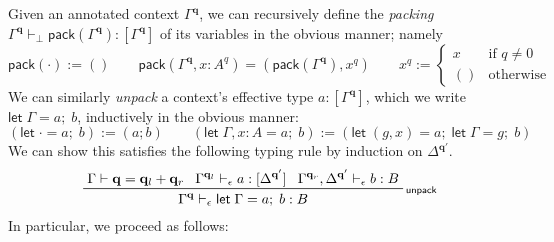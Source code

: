 \documentclass[acmsmall,screen,review]{acmart}
\newcommand{\mb}[1]{\ensuremath{\mathbf{#1}}}
\newcommand{\ms}[1]{\ensuremath{\mathsf{#1}}}
\newcommand{\letexpr}[3]{\ensuremath{\ms{let}\;#1 = #2;\;#3}}
\newcommand{\qsp}[4]{#1 \vdash #2 = #3 + #4}
\newcommand{\rle}[1]{{\scriptsize\textsf{#1}}}
\newcommand{\hasty}[4]{#1 \vdash_{#2} #3: {#4}}
\newcommand{\etoty}[1]{[#1]}
\begin{document}
Given an annotated context $\Gamma^{\mb{q}}$, we can recursively define the \emph{packing}
$\hasty{\Gamma^{\mb{q}}}{\bot}{\ms{pack}(\Gamma^{\mb{q}})}{\etoty{\Gamma^{\mb{q}}}}$ of its
variables in the obvious manner; namely
\begin{equation*}
  \ms{pack}(\cdot) := () \qquad
  \ms{pack}(\Gamma^{\mb{q}}, x : A^q) = (\ms{pack}(\Gamma^{\mb{q}}), x^q) \qquad
  x^q :=
  \begin{cases}
    x & \text{if } q \neq 0 \\
    () & \text{otherwise}
  \end{cases}
\end{equation*}
We can similarly \emph{unpack} a context's effective type $a : [\ms{\Gamma}^{\mb{q}}]$, which we
write $\letexpr{\Gamma}{a}{b}$, inductively in the obvious manner:
\begin{equation*}
  (\letexpr{\cdot}{a}{b}) := (a ; b) \qquad
  (\letexpr{\Gamma, x : A}{a}{b}) :=
  (\letexpr{(g, x)}{a}{\letexpr{\Gamma}{g}{b}}) 
\end{equation*}
We can show this satisfies the following typing rule by induction on $\Delta^{\mb{q}'}$.
\begin{equation*}
  \prftree[r]{\rle{unpack}}
    {\qsp{\Gamma}{\mb{q}}{\mb{q}_l}{\mb{q}_r}}
    {\hasty{\Gamma^{\mb{q}_l}}{\epsilon}{a}{[\Delta^{\mb{q}'}]}}
    {\hasty{\Gamma^{\mb{q}_r}, \Delta^{\mb{q}'}}{\epsilon}{b}{B}}
    {\hasty{\Gamma^{\mb{q}}}{\epsilon}{\letexpr{\Gamma}{a}{b}}{B}}
\end{equation*}
In particular, we proceed as follows:
\end{document}
